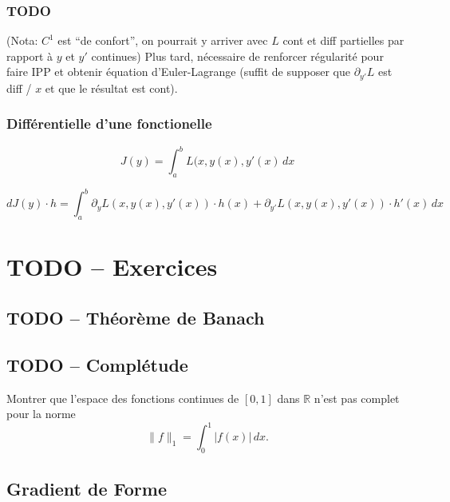 \documentclass[french,]{article}
\begin{document}
\hypertarget{todo-3}{%
\subsubsection{TODO}\label{todo-3}}

(Nota: \(C^1\) est ``de confort'', on pourrait y arriver avec \(L\) cont
et diff partielles par rapport à \(y\) et \(y'\) continues) Plus tard,
nécessaire de renforcer régularité pour faire IPP et obtenir équation
d'Euler-Lagrange (suffit de supposer que \(\partial_{y'}L\) est diff /
\(x\) et que le résultat est cont).

\hypertarget{diffuxe9rentielle-dune-fonctionelle}{%
\subsubsection{Différentielle d'une
fonctionelle}\label{diffuxe9rentielle-dune-fonctionelle}}

\[
J(y) = \int_a^b L(x, y(x), y'(x) \, dx
\]

\[
dJ(y) \cdot h = \int_a^b \partial_{y}L(x, y(x), y'(x)) \cdot h(x)+
\partial_{y'} L(x, y(x), y'(x)) \cdot h'(x)
\, dx
\]

\hypertarget{todo-exercices}{%
\section{TODO -- Exercices}\label{todo-exercices}}

\hypertarget{todo-thuxe9oruxe8me-de-banach}{%
\subsection{TODO -- Théorème de
Banach}\label{todo-thuxe9oruxe8me-de-banach}}

\hypertarget{todo-compluxe9tude}{%
\subsection{TODO -- Complétude}\label{todo-compluxe9tude}}

Montrer que l'espace des fonctions continues de \([0,1]\) dans
\(\mathbb{R}\) n'est pas complet pour la norme \[
\|f\|_1 = \int_0^1 |f(x)| \, dx.
\]

\hypertarget{gradient-de-forme}{%
\subsection{Gradient de Forme}\label{gradient-de-forme}}
\end{document}
